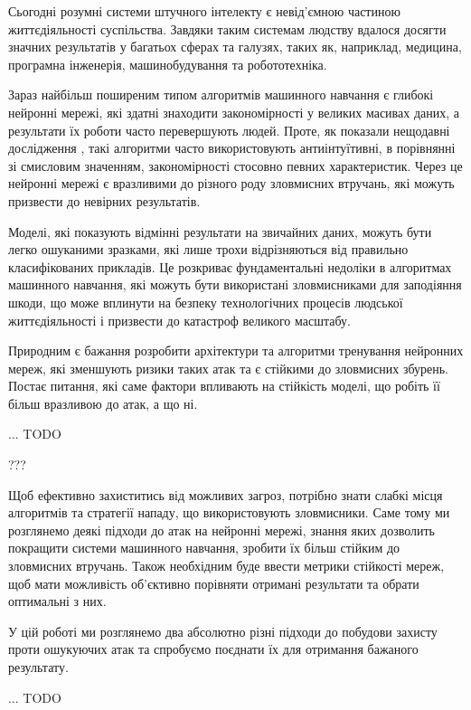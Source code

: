 \documentclass[14pt,a4paper]{extarticle}
\newcounter{e}
\numberwithin{equation}{section}
\numberwithin{figure}{section}
\begin{document}
Сьогодні розумні системи штучного інтелекту є невід'ємною частиною життєдіяльності суспільства. Завдяки таким системам людству вдалося досягти значних результатів у багатьох сферах та галузях, таких як, наприклад, медицина, програмна інженерія, машинобудування та робототехніка.

Зараз найбільш поширеним типом алгоритмів машинного навчання є глибокі нейронні мережі, які здатні знаходити закономірності у великих масивах даних, а результати їх роботи часто перевершують людей. Проте, як показали нещодавні дослідження \cite{first-work}, такі алгоритми часто використовують антиінтуїтивні, в порівнянні зі смисловим значенням, закономірності стосовно певних характеристик. Через це нейронні мережі є вразливими до різного роду зловмисних втручань, які можуть призвести до невірних результатів.

Моделі, які показують відмінні результати на звичайних даних, можуть бути легко ошуканими зразками, які лише трохи відрізняються від правильно класифікованих прикладів. Це розкриває фундаментальні недоліки в алгоритмах машинного навчання, які можуть бути використані зловмисниками для заподіяння шкоди, що може вплинути на безпеку технологічних процесів людської життєдіяльності і призвести до катастроф великого масштабу.

Природним є бажання розробити архітектури та алгоритми тренування нейронних мереж, які зменшують ризики таких атак та є стійкими до зловмисних збурень. Постає питання, які саме фактори впливають на стійкість моделі, що робіть її більш вразливою до атак, а що ні. 

... TODO


???

Щоб ефективно захиститись від можливих загроз, потрібно знати слабкі місця алгоритмів та стратегії нападу, що використовують зловмисники. Саме тому ми розглянемо деякі підходи до атак на нейронні мережі, знання яких дозволить покращити системи машинного навчання, зробити їх більш стійким до зловмисних втручань. Також необхідним буде ввести метрики стійкості мереж, щоб мати можливість об'єктивно порівняти отримані результати та обрати оптимальні з них. 



У цій роботі ми розглянемо два 
абсолютно різні
 підходи до побудови захисту проти ошукуючих атак та спробуємо поєднати їх для отримання бажаного результату.

... TODO
\end{document}
